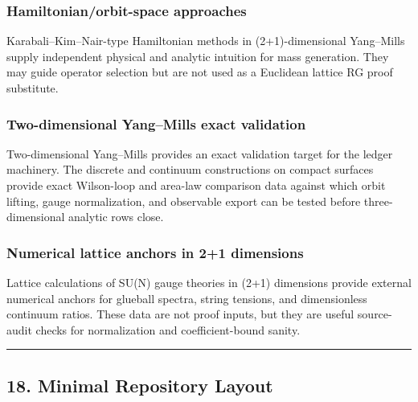 \documentclass[
]{article}
\begin{document}
\subsubsection{Hamiltonian/orbit-space
approaches}\label{hamiltonianorbit-space-approaches}

Karabali--Kim--Nair-type Hamiltonian methods in (2+1)-dimensional
Yang--Mills supply independent physical and analytic intuition for mass
generation. They may guide operator selection but are not used as a
Euclidean lattice RG proof substitute.

\subsubsection{Two-dimensional Yang--Mills exact
validation}\label{two-dimensional-yangmills-exact-validation}

Two-dimensional Yang--Mills provides an exact validation target for the
ledger machinery. The discrete and continuum constructions on compact
surfaces provide exact Wilson-loop and area-law comparison data against
which orbit lifting, gauge normalization, and observable export can be
tested before three-dimensional analytic rows close.

\subsubsection{Numerical lattice anchors in 2+1
dimensions}\label{numerical-lattice-anchors-in-21-dimensions}

Lattice calculations of SU(N) gauge theories in (2+1) dimensions provide
external numerical anchors for glueball spectra, string tensions, and
dimensionless continuum ratios. These data are not proof inputs, but
they are useful source-audit checks for normalization and
coefficient-bound sanity.

\begin{center}\rule{0.5\linewidth}{0.5pt}\end{center}

\subsection{18. Minimal Repository
Layout}\label{minimal-repository-layout}
\end{document}
